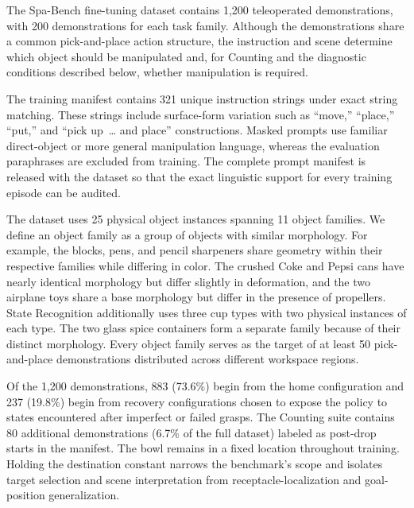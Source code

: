 The Spa-Bench fine-tuning dataset contains 1,200 teleoperated demonstrations, with 200 demonstrations for each task family. Although the demonstrations share a common pick-and-place action structure, the instruction and scene determine which object should be manipulated and, for Counting and the diagnostic conditions described below, whether manipulation is required.

The training manifest contains 321 unique instruction strings under exact string matching. These strings include surface-form variation such as ``move,'' ``place,'' ``put,'' and ``pick up~\ldots{} and place'' constructions. Masked prompts use familiar direct-object or more general manipulation language, whereas the evaluation paraphrases are excluded from training. The complete prompt manifest is released with the dataset so that the exact linguistic support for every training episode can be audited.

The dataset uses 25 physical object instances spanning 11 object families. We define an object family as a group of objects with similar morphology. For example, the blocks, pens, and pencil sharpeners share geometry within their respective families while differing in color. The crushed Coke and Pepsi cans have nearly identical morphology but differ slightly in deformation, and the two airplane toys share a base morphology but differ in the presence of propellers. State Recognition additionally uses three cup types with two physical instances of each type. The two glass spice containers form a separate family because of their distinct morphology. Every object family serves as the target of at least 50 pick-and-place demonstrations distributed across different workspace regions.

Of the 1,200 demonstrations, 883 (73.6\%) begin from the home configuration and 237 (19.8\%) begin from recovery configurations chosen to expose the policy to states encountered after imperfect or failed grasps. The Counting suite contains 80 additional demonstrations (6.7\% of the full dataset) labeled as post-drop starts in the manifest. The bowl remains in a fixed location throughout training. Holding the destination constant narrows the benchmark's scope and isolates target selection and scene interpretation from receptacle-localization and goal-position generalization.

